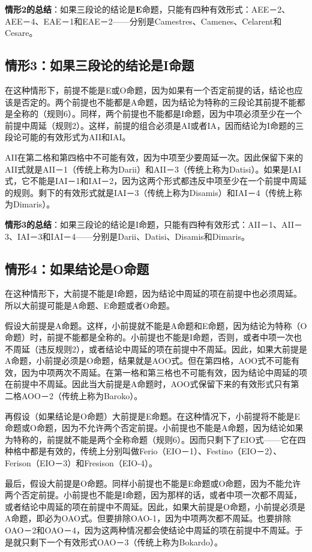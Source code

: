 \textbf{情形2的总结}：如果三段论的结论是$\mathbf{E}$命题，只能有四种有效形式：AEE－2、AEE－4、EAE－1和EAE－2——分别是Camestres、Camenes、Celarent和Cesare。

\subsection{情形3：如果三段论的结论是I命题}
在这种情形下，前提不能是E或O命题，因为如果有一个否定前提的话，结论也应该是否定的。两个前提也不能都是A命题，因为结论为特称的三段论其前提不能都是全称的（规则6）。同样，两个前提也不能都是I命题，因为中项必须至少在一个前提中周延（规则2）。这样，前提的组合必须是AI或者IA，因而结论为I命题的三段论可能的有效形式为AII和IAI。

AII在第二格和第四格中不可能有效，因为中项至少要周延一次。因此保留下来的AII式就是AII－1（传统上称为Darii）和AII－3（传统上称为Datisi）。如果是IAI式，它不能是IAI－1和IAI－2，因为这两个形式都违反中项至少在一个前提中周延的规则。剩下的有效形式就是IAI－3（传统上称为Disamis）和IAI－4（传统上称为Dimaris）。

\textbf{情形3的总结}：如果三段论的结论是I命题，只能有四种有效形式：AII－1、AII－3、IAI－3和IAI－4——分别是Darii、Datisi、Disamis和Dimaris。

\subsection{情形4：如果结论是$\mathbf{O}$命题}
在这种情形下，大前提不能是I命题，因为结论中周延的项在前提中也必须周延。所以大前提可能是A命题、E命题或者O命题。

假设大前提是A命题。这样，小前提就不能是A命题和E命题，因为结论为特称（O命题）时，前提不能都是全称的。小前提也不能是I命题，否则，或者中项一次也不周延（违反规则2），或者结论中周延的项在前提中不周延。因此，如果大前提是A命题，小前提必须是O命题，结果就是AOO式。但在第四格，AOO式不可能有效，因为中项两次不周延。在第一格和第三格也不可能有效，因为结论中周延的项在前提中不周延。因此当大前提是A命题时，AOO式保留下来的有效形式只有第二格AOO－2（传统上称为Baroko）。

再假设（如果结论是O命题）大前提是E命题。在这种情况下，小前提将不能是E命题或O命题，因为不允许两个否定前提。小前提也不能是A命题，因为结论如果为特称的，前提就不能是两个全称命题（规则6）。因而只剩下了EIO式——它在四种格中都是有效的，传统上分别叫做Ferio（EIO－1）、Festino（EIO－2）、Ferison（EIO－3）和Fresison（EIO-4）。

最后，假设大前提是O命题。同样小前提也不能是E命题或O命题，因为不能允许两个否定前提。小前提也不能是I命题，因为那样的话，或者中项一次都不周延，或者结论中周延的项在前提中不周延。因此，如果大前提是O命题，小前提必须是A命题，即必为OAO式。但要排除OAO-1，因为中项两次都不周延。也要排除OAO－2和OAO－4，因为这两种情况都会使结论中周延的项在前提中不周延。于是就只剩下一个有效形式OAO－3（传统上称为Bokardo）。

